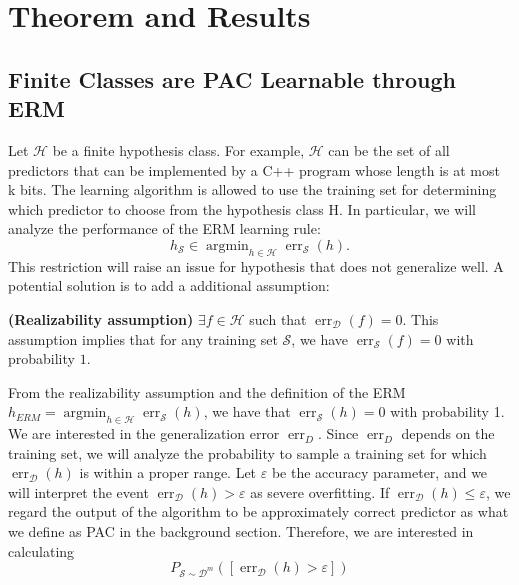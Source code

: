 

\section{Theorem and Results}

\newtheorem{theorem}{Theorem}
\newtheorem{corollary}{Corollary}

\subsection{Finite Classes are PAC Learnable through ERM}

Let $\mathcal{H}$ be a finite hypothesis class. For example, $\mathcal{H}$ can be the set of all predictors that can be implemented by a C++ program whose length is at most k bits. The learning algorithm is allowed to use the training set for determining which predictor to choose from the hypothesis class H. In particular, we will analyze the performance of the ERM learning rule:
\begin{equation*}
    h_{\mathcal{S}} \in \operatorname{argmin}_{h \in \mathcal{H}} \operatorname{err}_{\mathcal{S}} (h). 
\end{equation*}
This restriction will raise an issue for hypothesis that does not generalize well. A potential solution is to add a additional assumption: 
\begin{definition}{\textbf{(Realizability assumption)}}
$\exists f \in \mathcal{H}$ such that $\operatorname{err}_{\mathcal{D}}(f) = 0$. This assumption implies that for any training set $\mathcal{S}$, we have $\operatorname{err}_{\mathcal{S}}(f) = 0$ with probability $1$.\cite{Liang:2016}
\end{definition}

From the realizability assumption and the definition of the ERM $h_{ERM} = \operatorname{argmin}_{h \in \mathcal{H}} \operatorname{err}_{\mathcal{S}}(h)$, we have that $\operatorname{err}_{\mathcal{S}}(h) = 0$ with probability 1. We are interested in the generalization error $\operatorname{err}_{D}$. Since $\operatorname{err}_{D}$ depends on the training set, we will analyze the probability to sample a training set for which $\operatorname{err}_{\mathcal{D}}(h)$ is within a proper range. Let $\varepsilon$ be the accuracy parameter, and we will interpret the event $\operatorname{err}_{\mathcal{D}}(h) > \varepsilon$ as severe overfitting. If $\operatorname{err}_{\mathcal{D}}(h) \leq \varepsilon$, we regard the output of the algorithm to be approximately correct predictor as what we define as PAC in the background section. Therefore, we are interested in calculating
\begin{equation*}
    P_{\mathcal{S} \sim \mathcal{D}^{m}}([\operatorname{err}_{\mathcal{D}}(h) > \varepsilon] )
\end{equation*}

